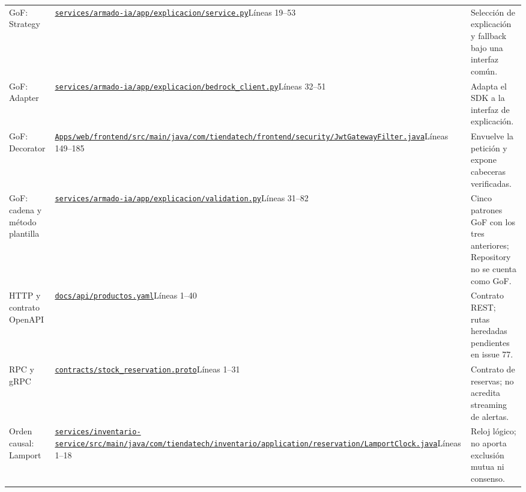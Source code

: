 {\begin{longtable}{>{\raggedright\arraybackslash}p{2.5cm}>{\raggedright\arraybackslash}p{6.7cm}>{\raggedright\arraybackslash}p{5.2cm}}
GoF: Strategy & \href{https://github.com/JoseLozanoMorales/TiendaTech/blob/d7a00ccf6d8ac5def08ff52f7d2880f869667b0b/services/armado-ia/app/explicacion/service.py\#L19-L53}{\nolinkurl{services/armado-ia/app/explicacion/service.py}}\newline Líneas 19--53 & Selección de explicación y fallback bajo una interfaz común.\\
GoF: Adapter & \href{https://github.com/JoseLozanoMorales/TiendaTech/blob/d7a00ccf6d8ac5def08ff52f7d2880f869667b0b/services/armado-ia/app/explicacion/bedrock_client.py\#L32-L51}{\nolinkurl{services/armado-ia/app/explicacion/bedrock_client.py}}\newline Líneas 32--51 & Adapta el SDK a la interfaz de explicación.\\
GoF: Decorator & \href{https://github.com/JoseLozanoMorales/TiendaTech/blob/d7a00ccf6d8ac5def08ff52f7d2880f869667b0b/Apps/web/frontend/src/main/java/com/tiendatech/frontend/security/JwtGatewayFilter.java\#L149-L185}{\nolinkurl{Apps/web/frontend/src/main/java/com/tiendatech/frontend/security/JwtGatewayFilter.java}}\newline Líneas 149--185 & Envuelve la petición y expone cabeceras verificadas.\\
GoF: cadena y método plantilla & \href{https://github.com/JoseLozanoMorales/TiendaTech/blob/d7a00ccf6d8ac5def08ff52f7d2880f869667b0b/services/armado-ia/app/explicacion/validation.py\#L31-L82}{\nolinkurl{services/armado-ia/app/explicacion/validation.py}}\newline Líneas 31--82 & Cinco patrones GoF con los tres anteriores; Repository no se cuenta como GoF.\\
HTTP y contrato OpenAPI & \href{https://github.com/JoseLozanoMorales/TiendaTech/blob/d7a00ccf6d8ac5def08ff52f7d2880f869667b0b/docs/api/productos.yaml\#L1-L40}{\nolinkurl{docs/api/productos.yaml}}\newline Líneas 1--40 & Contrato REST; rutas heredadas pendientes en issue 77.\\
RPC y gRPC & \href{https://github.com/JoseLozanoMorales/TiendaTech/blob/d7a00ccf6d8ac5def08ff52f7d2880f869667b0b/contracts/stock_reservation.proto\#L1-L31}{\nolinkurl{contracts/stock_reservation.proto}}\newline Líneas 1--31 & Contrato de reservas; no acredita streaming de alertas.\\
Orden causal: Lamport & \href{https://github.com/JoseLozanoMorales/TiendaTech/blob/d7a00ccf6d8ac5def08ff52f7d2880f869667b0b/services/inventario-service/src/main/java/com/tiendatech/inventario/application/reservation/LamportClock.java\#L1-L18}{\nolinkurl{services/inventario-service/src/main/java/com/tiendatech/inventario/application/reservation/LamportClock.java}}\newline Líneas 1--18 & Reloj lógico; no aporta exclusión mutua ni consenso.\\

\end{longtable}}
